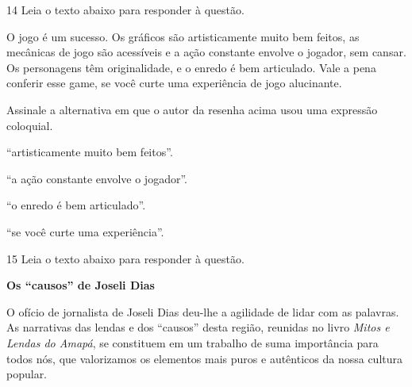 \num{14} Leia o texto abaixo para responder à questão. 

\begin{myquote}




O jogo é um sucesso. Os gráficos são artisticamente muito bem feitos, as
mecânicas de jogo são acessíveis e a ação constante envolve o jogador, sem
cansar. Os personagens têm originalidade, e o enredo é bem articulado. Vale 
a pena conferir esse game, se você curte uma experiência de jogo alucinante.


\end{myquote}

Assinale a alternativa em que o autor da resenha acima usou uma expressão 
coloquial.

\begin{escolha}
  
  \item ``artisticamente muito bem feitos''.
  
  \item ``a ação constante envolve o jogador''.
  
  \item ``o enredo é bem articulado''.
  
  \item ``se você curte uma experiência''.

\end{escolha}

\num{15} Leia o texto abaixo para responder à questão. 

\begin{myquote}

\textbf{Os ``causos'' de Joseli Dias}

O ofício de jornalista de Joseli Dias deu-lhe a agilidade de lidar com as
palavras. As narrativas das lendas e dos ``causos'' desta região, reunidas no
livro \textit{Mitos e Lendas do Amapá}, se constituem em um trabalho de suma
importância para todos nós, que valorizamos os elementos mais puros e
autênticos da nossa cultura popular.


\end{myquote}

